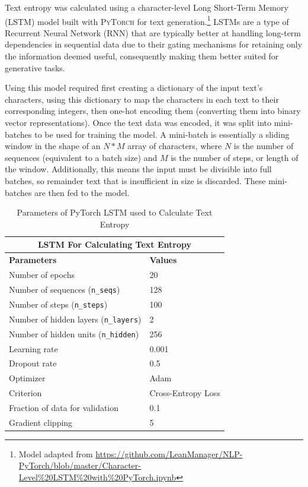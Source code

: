 \documentclass[12pt,a4paper]{article}
\numberwithin{figure}{section}
\numberwithin{table}{section}
\numberwithin{definition}{section}
\begin{document}

Text entropy was calculated using a character-level Long Short-Term Memory (LSTM) model built with \textsc{PyTorch} for text generation.\footnote{Model adapted from \url{https://github.com/LeanManager/NLP-PyTorch/blob/master/Character-Level\%20LSTM\%20with\%20PyTorch.ipynb}} LSTMs are a type of Recurrent Neural Network (RNN) that are typically better at handling long-term dependencies in sequential data due to their gating mechanisms for retaining only the information deemed useful, consequently making them better suited for generative tasks.

Using this model required first creating a dictionary of the input text's characters, using this dictionary to map the characters in each text to their corresponding integers, then one-hot encoding them (converting them into binary vector representations). Once the text data was encoded, it was split into mini-batches to be used for training the model. A mini-batch is essentially a sliding window in the shape of an \( N * M \) array of characters, where \( N \) is the number of sequences (equivalent to a batch size) and \( M \) is the number of steps, or length of the window. Additionally, this means the input must be divisible into full batches, so remainder text that is insufficient in size is discarded. These mini-batches are then fed to the model.

\begin{table}[h!] 
  \centering\small
  \renewcommand{\arraystretch}{1.5} 
  \begin{tabular}{@{}ll@{}}
  \hline
  \multicolumn{2}{|c|}{\textbf{LSTM For Calculating Text Entropy}} \\
  \hline
  \textbf{Parameters} & \textbf{Values} \\
  \hline
  Number of epochs & 20 \\
  Number of sequences (\texttt{n\_seqs}) & 128 \\
  Number of steps (\texttt{n\_steps}) & 100 \\
  Number of hidden layers (\texttt{n\_layers}) & 2 \\
  Number of hidden units (\texttt{n\_hidden}) & 256 \\
  Learning rate & 0.001 \\
  Dropout rate & 0.5 \\
  Optimizer & Adam \\
  Criterion & Cross-Entropy Loss \\
  Fraction of data for validation & 0.1 \\
  Gradient clipping & 5 \\
  \hline
  \end{tabular}
  \caption{Parameters of PyTorch LSTM used to Calculate Text Entropy}
  \label{tbl:pytorchlstmparams}
\end{table}
\end{document}

